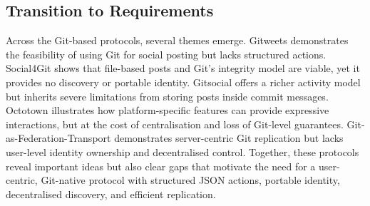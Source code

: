 \subsection*{Transition to Requirements}

Across the Git-based protocols, several themes emerge. Gitweets demonstrates the feasibility of using Git for social posting but lacks structured actions. Social4Git shows that file-based
posts and Git’s integrity model are viable, yet it provides no discovery or portable identity. Gitsocial
offers a richer activity model but inherits severe limitations from storing posts inside commit
messages. Octotown illustrates how platform-specific features can provide expressive interactions,
but at the cost of centralisation and loss of Git-level guarantees. Git-as-Federation-Transport
demonstrates server-centric Git replication but lacks user-level identity ownership and decentralised
control. Together, these protocols reveal important ideas but also clear gaps that motivate the need
for a user-centric, Git-native protocol with structured JSON actions, portable identity, decentralised
discovery, and efficient replication.
